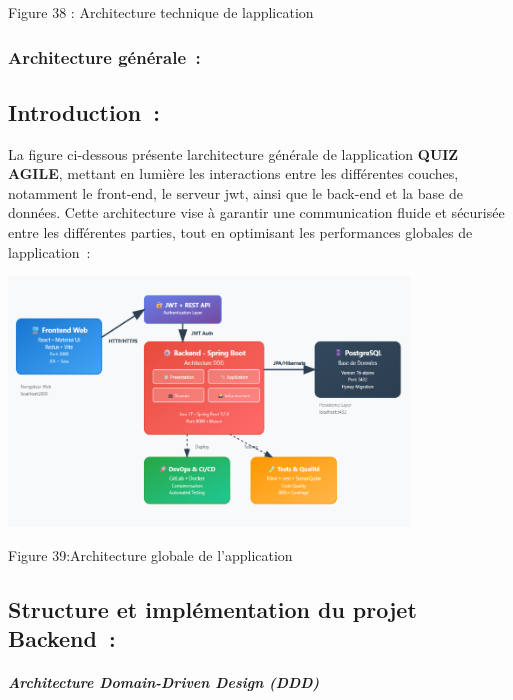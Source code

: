 \documentclass[12pt,a4paper,twoside]{report}
\begin{document}
\protect\hypertarget{_Toc203823448}{}{}Figure 38 : Architecture
technique de l\textquotesingle application

\hypertarget{architecture-guxe9nuxe9rale}{%
\subsubsection{Architecture
générale~:}\label{architecture-guxe9nuxe9rale}}

\hypertarget{introduction}{%
\subsection{Introduction~:}\label{introduction}}

La figure ci-dessous présente l\textquotesingle architecture générale de
l\textquotesingle application \textbf{QUIZ AGILE}, mettant en lumière
les interactions entre les différentes couches, notamment le front-end,
le serveur jwt, ainsi que le back-end et la base de données. Cette
architecture vise à garantir une communication fluide et sécurisée entre
les différentes parties, tout en optimisant les performances globales de
l\textquotesingle application~:

\includegraphics[width=4.19167in,height=2.61667in]{latex_media/media/image45.png}

\protect\hypertarget{_Toc203823449}{}{}Figure 39:Architecture globale de
l'application

\hypertarget{structure-et-impluxe9mentation-du-projet-backend}{%
\subsection{Structure et implémentation du projet
Backend~:}\label{structure-et-impluxe9mentation-du-projet-backend}}

\hypertarget{architecture-domain-driven-design-ddd}{%
\subparagraph{Architecture Domain-Driven Design
(DDD)}\label{architecture-domain-driven-design-ddd}}
\end{document}
